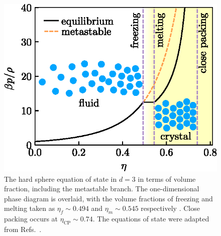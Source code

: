 \documentclass[11pt,twoside]{report}
\begin{document}
\begin{figure}
  \includegraphics[width=0.85\linewidth,outer]{hs-phase-diagram}
  \caption[The hard sphere equation of state and phase diagram]{
    The hard sphere equation of state in $d=3$ in terms of volume fraction, including the metastable branch.
    The one-dimensional phase diagram is overlaid, with the volume fractions of freezing and melting taken as $\eta_f \sim 0.494$ and $\eta_m \sim 0.545$ respectively \cite{HooverJCP1968}.
    Close packing occurs at $\eta_\mathrm{CP} \sim 0.74$.
    The equations of state were adapted from Refs.\ \cite{CarnahanJCP1969,SpeedyJPCM1998,BannermanJCP2010}.
  }
  \label{fig:hs-phase-diagram}
\end{figure}
\end{document}
